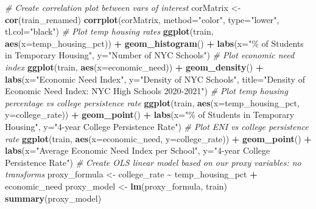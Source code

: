 \documentclass[
  man]{apa6}
\newenvironment{Shaded}{\begin{snugshade}}{\end{snugshade}}
\newcommand{\AttributeTok}[1]{\textcolor[rgb]{0.13,0.29,0.53}{#1}}
\newcommand{\CommentTok}[1]{\textcolor[rgb]{0.56,0.35,0.01}{\textit{#1}}}
\newcommand{\FunctionTok}[1]{\textcolor[rgb]{0.13,0.29,0.53}{\textbf{#1}}}
\newcommand{\NormalTok}[1]{#1}
\newcommand{\OtherTok}[1]{\textcolor[rgb]{0.56,0.35,0.01}{#1}}
\newcommand{\SpecialCharTok}[1]{\textcolor[rgb]{0.81,0.36,0.00}{\textbf{#1}}}
\newcommand{\StringTok}[1]{\textcolor[rgb]{0.31,0.60,0.02}{#1}}
\begin{document}
\begin{Shaded}
\begin{Highlighting}[]
\CommentTok{\# Create correlation plot between vars of interest}
\NormalTok{corMatrix }\OtherTok{\textless{}{-}} \FunctionTok{cor}\NormalTok{(train\_renamed)}
\FunctionTok{corrplot}\NormalTok{(corMatrix, }\AttributeTok{method=}\StringTok{"color"}\NormalTok{, }\AttributeTok{type=}\StringTok{"lower"}\NormalTok{, }\AttributeTok{tl.col=}\StringTok{"black"}\NormalTok{)}
\CommentTok{\# Plot temp housing rates}
\FunctionTok{ggplot}\NormalTok{(train, }\FunctionTok{aes}\NormalTok{(}\AttributeTok{x=}\NormalTok{temp\_housing\_pct)) }\SpecialCharTok{+}
  \FunctionTok{geom\_histogram}\NormalTok{() }\SpecialCharTok{+}
  \FunctionTok{labs}\NormalTok{(}\AttributeTok{x=}\StringTok{"\% of Students in Temporary Housing"}\NormalTok{, }\AttributeTok{y=}\StringTok{"Number of NYC Schools"}\NormalTok{)}
\CommentTok{\# Plot economic need index}
\FunctionTok{ggplot}\NormalTok{(train, }\FunctionTok{aes}\NormalTok{(}\AttributeTok{x=}\NormalTok{economic\_need)) }\SpecialCharTok{+}
  \FunctionTok{geom\_density}\NormalTok{() }\SpecialCharTok{+}
  \FunctionTok{labs}\NormalTok{(}\AttributeTok{x=}\StringTok{"Economic Need Index"}\NormalTok{, }\AttributeTok{y=}\StringTok{"Density of NYC Schools"}\NormalTok{,}
       \AttributeTok{title=}\StringTok{"Density of Economic Need Index: NYC High Schools 2020{-}2021"}\NormalTok{)}
\CommentTok{\# Plot temp housing percentage vs college persistence rate}
\FunctionTok{ggplot}\NormalTok{(train, }\FunctionTok{aes}\NormalTok{(}\AttributeTok{x=}\NormalTok{temp\_housing\_pct, }\AttributeTok{y=}\NormalTok{college\_rate)) }\SpecialCharTok{+}
  \FunctionTok{geom\_point}\NormalTok{() }\SpecialCharTok{+}
  \FunctionTok{labs}\NormalTok{(}\AttributeTok{x=}\StringTok{"\% of Students in Temporary Housing"}\NormalTok{,}
       \AttributeTok{y=}\StringTok{"4{-}year College Persistence Rate"}\NormalTok{)}
\CommentTok{\# Plot ENI vs college persistence rate}
\FunctionTok{ggplot}\NormalTok{(train, }\FunctionTok{aes}\NormalTok{(}\AttributeTok{x=}\NormalTok{economic\_need, }\AttributeTok{y=}\NormalTok{college\_rate)) }\SpecialCharTok{+}
  \FunctionTok{geom\_point}\NormalTok{() }\SpecialCharTok{+}
  \FunctionTok{labs}\NormalTok{(}\AttributeTok{x=}\StringTok{"Average Economic Need Index per School"}\NormalTok{,}
       \AttributeTok{y=}\StringTok{"4{-}year College Persistence Rate"}\NormalTok{)}
\CommentTok{\# Create OLS linear model based on our proxy variables: no transforms}
\NormalTok{proxy\_formula }\OtherTok{\textless{}{-}}\NormalTok{ college\_rate }\SpecialCharTok{\textasciitilde{}}\NormalTok{ temp\_housing\_pct }\SpecialCharTok{+}\NormalTok{ economic\_need}
\NormalTok{proxy\_model }\OtherTok{\textless{}{-}} \FunctionTok{lm}\NormalTok{(proxy\_formula, train)}
\FunctionTok{summary}\NormalTok{(proxy\_model)}


\end{Highlighting}
\end{Shaded}
\end{document}
